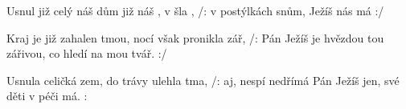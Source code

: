 \begin{TEXT}{Usnul již celý náš dům} %
\SLOKA {} již  náš ,
 v  šla ,
/:  v postýlkách  snům,
 Ježíš nás má  :/

\SLOKA Kraj je již zahalen tmou,
nocí však pronikla zář,
/: Pán Ježíš je hvězdou tou zářivou,
co hledí na mou tvář. :/

\SLOKA Usnula celičká zem,
do trávy ulehla tma,
/: aj, nespí nedřímá Pán Ježíš jen,
své děti v péči má. :
\end{TEXT}